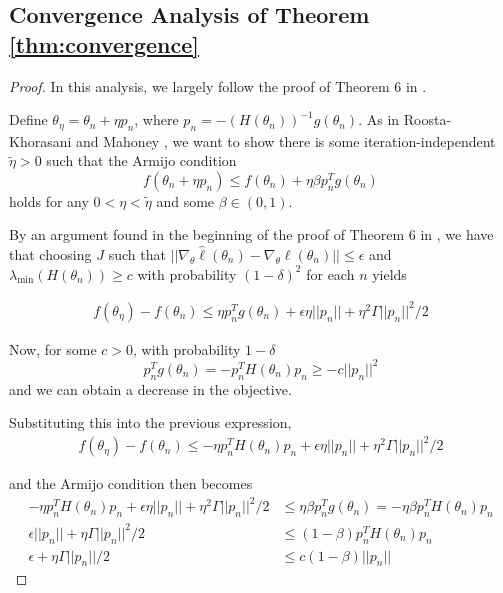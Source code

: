 \documentclass{article}
\begin{document}
\subsection{Convergence Analysis of Theorem \ref{thm:convergence}}

\begin{proof}

In this analysis, we largely follow the proof of Theorem 6 in \cite{mahoney16}.

Define $\theta_\eta = \theta_n + \eta p_n$, where $p_n=-(H(\theta_n))^{-1}g(\theta_n)$. As in Roosta-Khorasani and Mahoney \cite{mahoney16}, we want to show there is some iteration-independent $\tilde{\eta}>0$ such that the Armijo condition
\begin{equation}
    f(\theta_n+\eta p_n) \leq f(\theta_n) + \eta\beta p_n^Tg(\theta_n)
\end{equation}
holds for any $0< \eta < \tilde{\eta}$ and some $\beta \in (0,1)$.

By an argument found in the beginning of the proof of Theorem 6 in \cite{mahoney16}, we have that choosing $J$ such that $||\nabla_\theta\hat{\ell}(\theta_n) - \nabla_\theta \ell(\theta_n)|| \leq \epsilon$ and $\lambda_{\min}(H(\theta_n)) \geq c$ with probability $(1-\delta)^2$ for each $n$ yields

\begin{align}
    f(\theta_\eta)-f(\theta_n) \leq \eta p_n^Tg(\theta_n) + \epsilon\eta||p_n|| + \eta^2 \Gamma ||p_n||^2 / 2
\end{align}

Now, for some $c>0$, with probability $1-\delta$
\begin{equation}
    p_n^Tg(\theta_n) = -p_n^TH(\theta_n)p_n \geq -c||p_n||^2
\end{equation}
and we can obtain a decrease in the objective. 

Substituting this into the previous expression,
\begin{align}
    f(\theta_\eta)-f(\theta_n) \leq -\eta p_n^TH(\theta_n)p_n + \epsilon\eta||p_n|| + \eta^2 \Gamma ||p_n||^2 / 2
\end{align}

and the Armijo condition then becomes
\begin{align}
    -\eta p_n^TH(\theta_n)p_n + \epsilon\eta||p_n|| + \eta^2 \Gamma ||p_n||^2 / 2 &\leq \eta \beta p_n^Tg(\theta_n) = - \eta \beta p_n^TH(\theta_n)p_n \\
    \epsilon||p_n|| + \eta \Gamma ||p_n||^2 / 2 &\leq (1- \beta) p_n^TH(\theta_n)p_n \\
    \epsilon + \eta \Gamma ||p_n|| / 2 &\leq c(1- \beta) ||p_n||
\end{align}


\end{proof}
\end{document}
